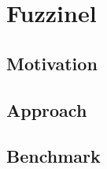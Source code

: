 \newcommand{\bulletgood}{\large\color{dkclrd}$\bm{\checkmark}$}
\newcommand{\bulletbad}{\large\color{clre}$\bm{\times}$}

\section{Fuzzinel}
\subsection{Motivation}
\frameready{}{
  
  
}

\subsection{Approach}
\frameready{}{
  
  
  
}

\subsection{Benchmark}
\frameready{}{
  
  
  
}
